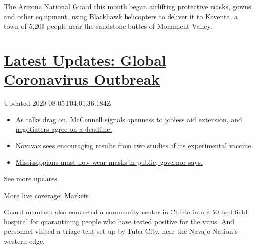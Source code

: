 The Arizona National Guard this month began airlifting protective masks,
gowns and other equipment, using Blackhawk helicopters to deliver it to
Kayenta, a town of 5,200 people near the sandstone buttes of Monument
Valley.

\hypertarget{latest-updates-global-coronavirus-outbreak}{%
\section{\texorpdfstring{\href{https://www.nytimes.com/2020/08/04/world/coronavirus-cases.html?action=click\&pgtype=Article\&state=default\&region=MAIN_CONTENT_1\&context=storylines_live_updates}{Latest
Updates: Global Coronavirus
Outbreak}}{Latest Updates: Global Coronavirus Outbreak}}\label{latest-updates-global-coronavirus-outbreak}}

Updated 2020-08-05T04:01:36.184Z

\begin{itemize}
\tightlist
\item
  \href{https://www.nytimes.com/2020/08/04/world/coronavirus-cases.html?action=click\&pgtype=Article\&state=default\&region=MAIN_CONTENT_1\&context=storylines_live_updates\#link-762df92}{As
  talks drag on, McConnell signals openness to jobless aid extension,
  and negotiators agree on a deadline.}
\item
  \href{https://www.nytimes.com/2020/08/04/world/coronavirus-cases.html?action=click\&pgtype=Article\&state=default\&region=MAIN_CONTENT_1\&context=storylines_live_updates\#link-1228a480}{Novavax
  sees encouraging results from two studies of its experimental
  vaccine.}
\item
  \href{https://www.nytimes.com/2020/08/04/world/coronavirus-cases.html?action=click\&pgtype=Article\&state=default\&region=MAIN_CONTENT_1\&context=storylines_live_updates\#link-794484ed}{Mississippians
  must now wear masks in public, governor says.}
\end{itemize}

\href{https://www.nytimes.com/2020/08/04/world/coronavirus-cases.html?action=click\&pgtype=Article\&state=default\&region=MAIN_CONTENT_1\&context=storylines_live_updates}{See
more updates}

More live coverage:
\href{https://www.nytimes.com/live/2020/08/04/business/stock-market-today-coronavirus?action=click\&pgtype=Article\&state=default\&region=MAIN_CONTENT_1\&context=storylines_live_updates}{Markets}

Guard members also converted a community center in Chinle into a 50-bed
field hospital for quarantining people who have tested positive for the
virus. And personnel visited a triage tent set up by Tuba City, near the
Navajo Nation's western edge.

